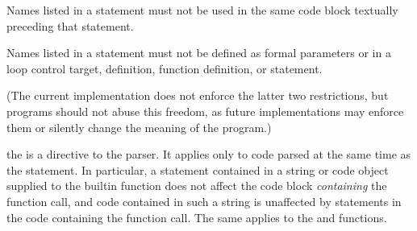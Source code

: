 Names listed in a  statement must not be used in the same
code block textually preceding that  statement.

Names listed in a  statement must not be defined as formal
parameters or in a  loop control target, 
definition, function definition, or  statement.

(The current implementation does not enforce the latter two
restrictions, but programs should not abuse this freedom, as future
implementations may enforce them or silently change the meaning of the
program.)

the  is a directive to the parser.  It
applies only to code parsed at the same time as the 
statement.  In particular, a  statement contained in a
string or code object supplied to the builtin  function
does not affect the code block \emph{containing} the function call,
and code contained in such a string is unaffected by 
statements in the code containing the function call.  The same applies to the
 and  functions.


